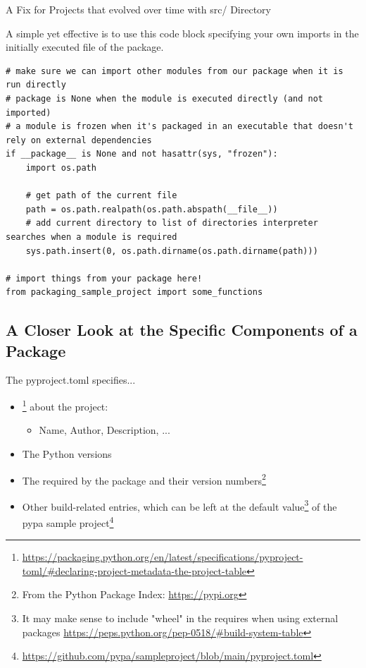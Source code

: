 \documentclass[12pt, aspectratio=169, usepdftitle=false]{beamer}
\newcommand{\furl}[1]{\footnote{\url{#1}}}
\begin{document}
\begin{frame}[fragile]{A Fix for Projects that evolved over time with src/ Directory}
	
	A simple yet effective  is to use this code block  specifying your own imports in the initially executed file of the package.
	\pause
	
	
	\begin{lstlisting}[language=pytiny]
# make sure we can import other modules from our package when it is run directly
# package is None when the module is executed directly (and not imported)
# a module is frozen when it's packaged in an executable that doesn't rely on external dependencies
if __package__ is None and not hasattr(sys, "frozen"):
    import os.path

    # get path of the current file
    path = os.path.realpath(os.path.abspath(__file__))
    # add current directory to list of directories interpreter searches when a module is required
    sys.path.insert(0, os.path.dirname(os.path.dirname(path)))

# import things from your package here!
from packaging_sample_project import some_functions
	\end{lstlisting}
	
\end{frame}


\subsection{A Closer Look at the Specific Components of a Package}


\begin{frame}{The pyproject.toml specifies...}
	\begin{itemize}
		\item {}\furl{https://packaging.python.org/en/latest/specifications/pyproject-toml/\#declaring-project-metadata-the-project-table} about the project:
		\begin{itemize}
			\item Name, Author, Description, ...
		\end{itemize}
		\item The  Python versions
		\item The  required by the package and their version numbers\footnote{From the Python Package Index: \url{https://pypi.org}}
		\item Other build-related entries, which can be left at the default value\footnote{It may make sense to include "wheel" in the requires when using external packages \url{https://peps.python.org/pep-0518/\#build-system-table}} of the pypa sample project\furl{https://github.com/pypa/sampleproject/blob/main/pyproject.toml}
	\end{itemize}
\end{frame}
\end{document}
